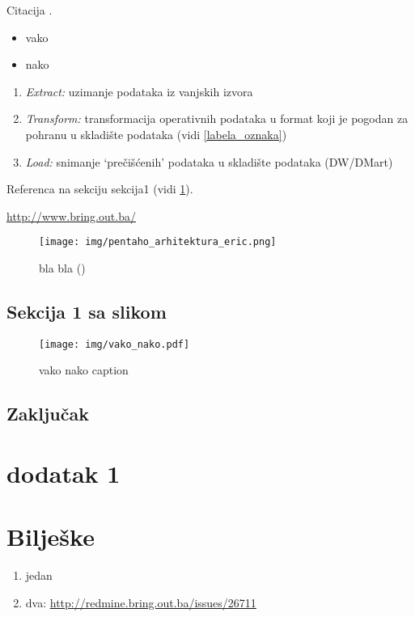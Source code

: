 \documentclass[times, utf8, seminar]{fit}
\begin{document}
Citacija \cite[str.~391]{pentaho32}.

\begin{itemize}
   \item vako 
   \item nako
\end{itemize}

\begin{enumerate}
  \item \emph{Extract:}  uzimanje podataka iz vanjskih izvora
  \item \emph{Transform:} transformacija operativnih podataka u format koji je pogodan za pohranu u skladište podataka (vidi \ref{labela_oznaka})
  \item \emph{Load:} snimanje `prečišćenih' podataka u skladište podataka (DW/DMart)
\end{enumerate}
 

Referenca na sekciju sekcija1 (vidi \ref{sect:sekcija1}).

\url{http://www.bring.out.ba/}
 
\begin{figure}[H]
\centering
\texttt{[image: img/pentaho\_arhitektura\_eric.png]}
\caption{bla bla (\cite{web:eric})}
\end{figure}

\section{Sekcija 1 sa slikom}
\label{sect:sekcija1}

\begin{figure}[H]
\centering
\texttt{[image: img/vako\_nako.pdf]}
\caption{vako nako caption}
\end{figure}


\section{Zaključak}




\appendix

\chapter{dodatak 1}
\label{chap:dodatak1}

\chapter{Bilješke}
\label{chap:biljeske}

\begin{enumerate}
  \item jedan
  \item dva: \url{http://redmine.bring.out.ba/issues/26711}
\end{enumerate}
\end{document}
